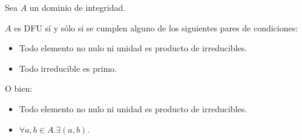 \begin{theorem}
Sea $A$ un dominio de integridad. 

$A$ es DFU sí y sólo si se cumplen alguno de los siguientes pares de condiciones:

\begin{itemize}
\item Todo elemento no nulo ni unidad es producto de irreducibles. 
\item Todo irreducible es primo.
\end{itemize}

O bien:

\begin{itemize}
\item Todo elemento no nulo ni unidad es producto de irreducibles.
\item $\forall a,b \in A. \exists (a,b)$. 
\end{itemize}
\end{theorem}
